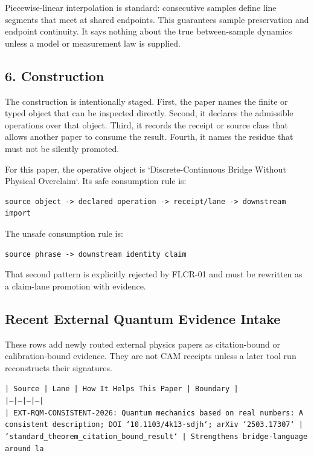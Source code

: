\documentclass[11pt]{article}
\begin{document}
Piecewise-linear interpolation is standard: consecutive samples define line segments that meet at shared endpoints. This guarantees sample preservation and endpoint continuity. It says nothing about the true between-sample dynamics unless a model or measurement law is supplied.

\subsection*{6. Construction}

The construction is intentionally staged. First, the paper names the finite or
typed object that can be inspected directly. Second, it declares the admissible
operations over that object. Third, it records the receipt or source class that
allows another paper to consume the result. Fourth, it names the residue that
must not be silently promoted.

For this paper, the operative object is `Discrete-Continuous Bridge Without Physical Overclaim`. Its safe consumption
rule is:

\begin{verbatim}
source object -> declared operation -> receipt/lane -> downstream import
\end{verbatim}

The unsafe consumption rule is:

\begin{verbatim}
source phrase -> downstream identity claim
\end{verbatim}

That second pattern is explicitly rejected by FLCR-01 and must be rewritten as
a claim-lane promotion with evidence.

\subsection*{Recent External Quantum Evidence Intake}

These rows add newly routed external physics papers as citation-bound or calibration-bound evidence. They are not CAM receipts unless a later tool run reconstructs their signatures.

\noindent\texttt{| Source | Lane | How It Helps This Paper | Boundary |}\\
\noindent\texttt{|---|---|---|---|}\\
\noindent\texttt{| EXT-RQM-CONSISTENT-2026: Quantum mechanics based on real numbers: A consistent description; DOI `10.1103/4k13-sdjh`; arXiv `2503.17307` | `standard\_theorem\_citation\_bound\_result` | Strengthens bridge-language around la}\\
\end{document}
